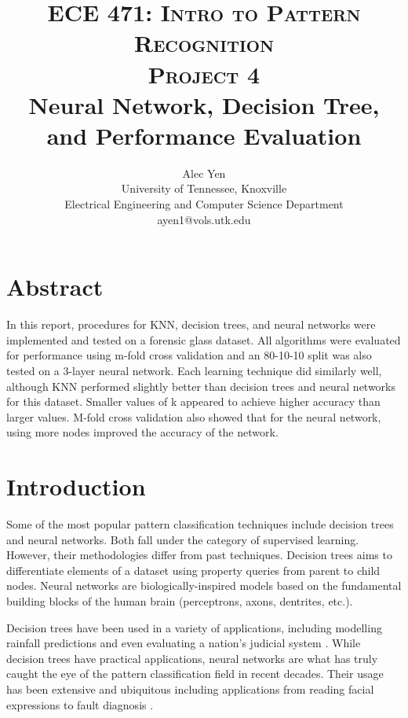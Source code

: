 \documentclass[paper=a4, fontsize=11pt,twoside]{scrartcl}	%
\title{	\normalsize \textsc{ECE 471: Intro to Pattern Recognition \\ Project 4} 	%
		 	\\[2.0cm]								%
			\LARGE \textbf{{Neural Network, Decision Tree, and Performance Evaluation}}	%
		}
\author{
		Alec Yen\\	
		University of Tennessee, Knoxville\\	
		Electrical Engineering and Computer Science Department\\
        ayen1@vols.utk.edu \\
}
\makeatletter
\def\printtitle{%
    {\centering \@title\par}}
\def\printauthor{%
    {\centering \large \@author}}
\makeatother
\begin{document}
\thispagestyle{empty}		%

\printtitle					%
\vfill
\printauthor				%
\newpage
\setcounter{page}{1}		%


\section{Abstract}
In this report, procedures for KNN, decision trees, and neural networks were implemented and tested on a forensic glass dataset. All algorithms were evaluated for performance using m-fold cross validation and an 80-10-10 split was also tested on a 3-layer neural network. Each learning technique did similarly well, although KNN performed slightly better than decision trees and neural networks for this dataset. Smaller values of k appeared to achieve higher accuracy than larger values. M-fold cross validation also showed that for the neural network, using more nodes improved the accuracy of the network.


\section{Introduction}


Some of the most popular pattern classification techniques include decision trees and neural networks. Both fall under the category of supervised learning. However, their methodologies differ from past techniques. Decision trees aims to differentiate elements of a dataset using property queries from parent to child nodes. Neural networks are biologically-inspired models based on the fundamental building blocks of the human brain (perceptrons, axons, dentrites, etc.).

Decision trees have been used in a variety of applications, including modelling rainfall predictions \cite{geetha2014data} and even evaluating a nation's judicial system \cite{tsai2010performance}. While decision trees have practical applications, neural networks are what has truly caught the eye of the pattern classification field in recent decades. Their usage has been extensive and ubiquitous including applications from reading facial expressions \cite{kobayashi1993dynamic} to fault diagnosis \cite{gupta2015fault}.
\end{document}
